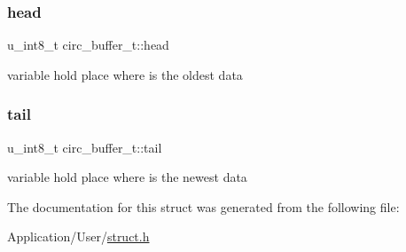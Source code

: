 \subsubsection{\texorpdfstring{head}{head}}
{\footnotesize\ttfamily u\+\_\+int8\+\_\+t circ\+\_\+buffer\+\_\+t\+::head}

variable hold place where is the oldest data \mbox{\label{structcirc__buffer__t_ac263e578598ba3ca3c25af3977450e27}} 
\subsubsection{\texorpdfstring{tail}{tail}}
{\footnotesize\ttfamily u\+\_\+int8\+\_\+t circ\+\_\+buffer\+\_\+t\+::tail}

variable hold place where is the newest data 

The documentation for this struct was generated from the following file\+:\begin{DoxyCompactItemize}
\item 
Application/\+User/\hyperlink{struct_8h}{struct.\+h}\end{DoxyCompactItemize}
